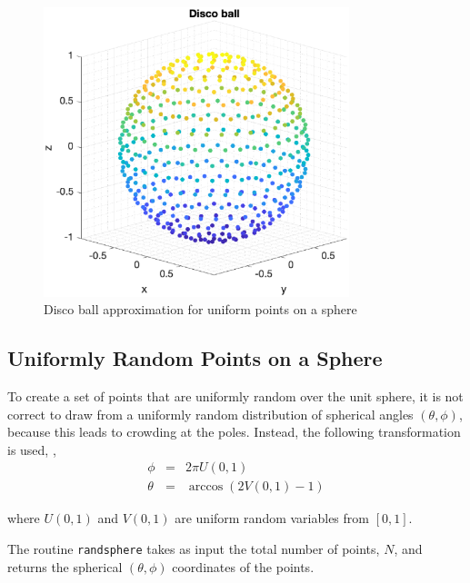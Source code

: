 \begin{figure}[H]
\centering
\includegraphics[width=3.5in]{Utilities/Figures/discoball}
\caption{Disco ball approximation for uniform points on a sphere}
\end{figure}

{\footnotesize
{}
}

\clearpage
\newpage

\subsection{Uniformly Random Points on a Sphere}

To create a set of points that are uniformly random over the unit sphere, it is not correct to draw from a uniformly random distribution of spherical angles $(\theta,\phi)$, because this leads to crowding at the poles.  Instead, the following transformation is used, \cite{randsphere}, 
\begin{eqnarray}
\phi &=& 2\pi U(0,1) \\
\theta &=& \arccos(2V(0,1)-1)
\end{eqnarray}

\noindent where $U(0,1)$ and $V(0,1)$ are uniform random variables from $[0,1]$.  

The routine \texttt{randsphere} takes as input the total number of points, $N$, and returns the spherical $(\theta,\phi)$ coordinates of the points.  

